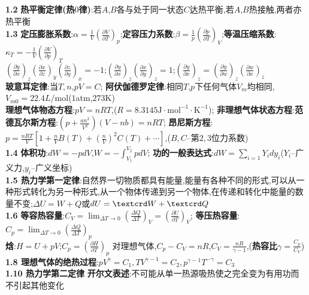 \documentclass[10pt,a4paper]{article}
\begin{document}
\begin{multicols}{2}
\noindent\textbf{1.2}
\textbf{热平衡定律(热$0$律)}:若$A$,$B$各与处于同一状态$C$达热平衡,若$A$,$B$热接触,两者亦热平衡\\
\textbf{1.3}
\textbf{定压膨胀系数}:$\alpha=\frac{1}{V}\left(\frac{\partial V}{\partial T}\right)_p$;\textbf{定容压力系数}:$\beta=\frac{1}{p}\left(\frac{\partial p}{\partial T}\right)_V$;\textbf{等温压缩系数}:$\kappa_T=-\frac{1}{V}\left(\frac{\partial V}{\partial p}\right)_T$\\
$\left(\frac{\partial y}{\partial x}\right)_z\left(\frac{\partial x}{\partial z}\right)_y\left(\frac{\partial z}{\partial y}\right)_x=-1$;$\left(\frac{\partial y}{\partial x}\right)_z\left(\frac{\partial x}{\partial y}\right)_z=1$;$\left(\frac{\partial y}{\partial x}\right)_z=\left(\frac{\partial y}{\partial w}\right)_z\left(\frac{\partial w}{\partial x}\right)_z$\\
\textbf{玻意耳定律}:当$T,n$,$pV=C$;
\textbf{阿伏伽德罗定律}:相同$T$,$p$下任何气体$V_m$均相同,$V_{m0}=22.4L/$mol($1$atm,$273$K)\\
\textbf{理想气体物态方程}:$pV=nRT$,($R=8.3145\text{J}\cdot\text{mol}^{-1}\cdot\text{K}^{-1}$);
\textbf{非理想气体状态方程}:\textbf{范德瓦尔斯方程}:$(p+\frac{an^2}{V^2})(V-nb)=nRT$;
\textbf{昂尼斯方程}:$p=\frac{nRT}{V}\left[1+\frac{n}{V}B(T)+\left(\frac{n}{V}\right)^2C(T)+\cdots\right]$,($B,C$--第$2,3$位力系数)\\
\textbf{1.4}
\textbf{体积功}:$dW=-pdV$,$W=-\int_{V_1}^{V_2}pdV$;
\textbf{功的一般表达式}:$dW=\sum_{i=1}Y_idy_i$($Y_i$--广义力,$y_i$--广义坐标)\\
\textbf{1.5 热力学第一定律}:自然界一切物质都具有能量,能量有各种不同的形式,可以从一种形式转化为另一种形式,从一个物体传递到另一个物体,在传递和转化中能量的数量不变;$\Delta U=W+Q$或$dU=\text{\textcrd}W+\text{\textcrd}Q$\\
\textbf{1.6}
\textbf{等容热容量}:$C_V=\lim_{\Delta T\rightarrow0}\left(\frac{\Delta Q}{\Delta T}\right)_V=\left(\frac{\partial U}{\partial T}\right)_V$;
\textbf{等压热容量}:$C_p=\lim_{\Delta T\rightarrow0}\left(\frac{\Delta Q}{\Delta T}\right)_p$\\
\textbf{焓}:$H=U+pV$;$C_p=\left(\frac{\partial H}{\partial T}\right)_p$\quad
对理想气体,$C_p-C_V=nR$,$C_V=\frac{nR}{\gamma-1}$,(\textbf{热容比}$\gamma=\frac{C_p}{C_V}$)\\
\textbf{1.8 理想气体的绝热过程}:$pV^{\gamma}=C_1,TV^{\gamma-1}=C_2,p^{\gamma-1}T^{-\gamma}=C_3$\\
\textbf{1.10 热力学第二定律}
\textbf{开尔文表述}:不可能从单一热源吸热使之完全变为有用功而不引起其他变化\\

\end{multicols}
\end{document}
